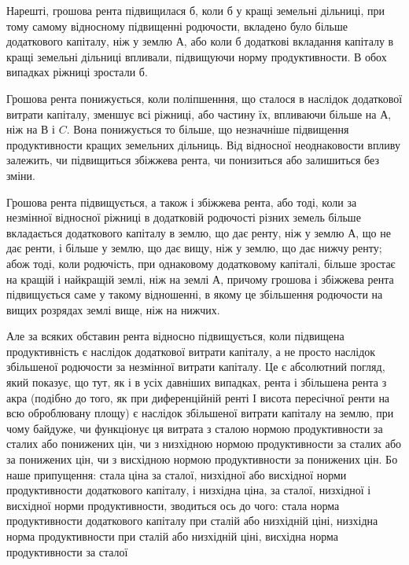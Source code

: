 
Нарешті, грошова рента підвищилася б, коли б у кращі земельні дільниці,
при тому самому відносному підвищенні родючости, вкладено було більше
додаткового капіталу, ніж у землю $А$, або коли б додаткові вкладання капіталу в кращі
земельні дільниці впливали, підвищуючи норму продуктивности. В обох випадках
ріжниці зростали б.

Грошова рента понижується, коли поліпшенння, що сталося в наслідок
додаткової витрати капіталу, зменшує всі ріжниці, або частину їх, впливаючи
більше на $А$, ніж на $В$ і $C$. Вона понижується то більше, що незначніше
підвищення продуктивности кращих земельних дільниць. Від відносної неоднаковости
впливу залежить, чи підвищиться збіжжева рента, чи понизиться або
залишиться без зміни.

Грошова рента підвищується, а також і збіжжева рента, або тоді, коли за
незмінної відносної ріжниці в додатковій родючості різних земель більше вкладається
додаткового капіталу в землю, що дає ренту, ніж у землю $А$, що не дає
ренти, і більше у землю, що дає вищу, ніж у землю, що дає нижчу ренту;
абож тоді, коли родючість, при однаковому додатковому капіталі, більше зростає
на кращій і найкращій землі, ніж на землі $А$, причому грошова і збіжжева
рента підвищується саме у такому відношенні, в якому це збільшення родючости
на вищих розрядах землі вище, ніж на нижчих.

Але за всяких обставин рента відносно підвищується, коли підвищена продуктивність
є наслідок додаткової витрати капіталу, а не просто наслідок
збільшеної родючости за незмінної витрати капіталу. Це є абсолютний погляд,
який показує, що тут, як і в усіх давніших випадках, рента і збільшена рента з акра
(подібно до того, як при диференційній ренті І висота пересічної ренти на всю
оброблювану площу) є наслідок збільшеної витрати капіталу на землю, при
чому байдуже, чи функціонує ця витрата з сталою нормою продуктивности за
сталих або понижених цін, чи з низхідною нормою продуктивности за сталих або
за понижених цін, чи з висхідною нормою продуктивности за понижених цін.
Бо наше припущення: стала ціна за сталої, низхідної або висхідної норми продуктивности додаткового
капіталу, і низхідна ціна, за сталої, низхідної і висхідної
норми продуктивности, зводиться ось до чого: стала норма продуктивности додаткового капіталу при
сталій або низхідній ціні, низхідна норма продуктивности
при сталій або низхідній ціні, висхідна норма продуктивности за сталої
\parbreak{}  %
